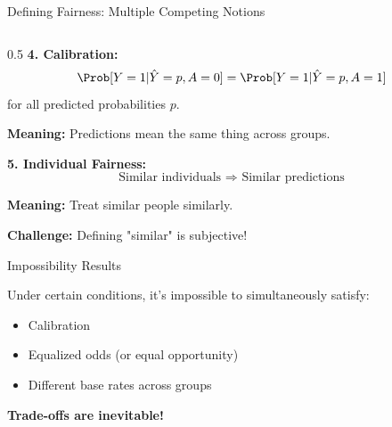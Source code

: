 \begin{frame}{Defining Fairness: Multiple Competing Notions}
\begin{columns}
\begin{column}{0.5\textwidth}
\vspace{0.3cm}
\textbf{4. Calibration:}
\[\Prob[Y = 1 | \hat{Y} = p, A = 0] = \Prob[Y = 1 | \hat{Y} = p, A = 1]\]
for all predicted probabilities $p$.

\textbf{Meaning:} Predictions mean the same thing across groups.

\vspace{0.3cm}
\textbf{5. Individual Fairness:}
\[\text{Similar individuals } \Rightarrow \text{ Similar predictions}\]

\textbf{Meaning:} Treat similar people similarly.

\textbf{Challenge:} Defining "similar" is subjective!

\vspace{0.3cm}
\begin{alertblock}{Impossibility Results}
\begin{theorem}
Under certain conditions, it's impossible to simultaneously satisfy:
\begin{itemize}
\item Calibration
\item Equalized odds (or equal opportunity)
\item Different base rates across groups
\end{itemize}
\end{theorem}
\textbf{Trade-offs are inevitable!}
\end{alertblock}
\end{column}
\end{columns}
\end{frame}

